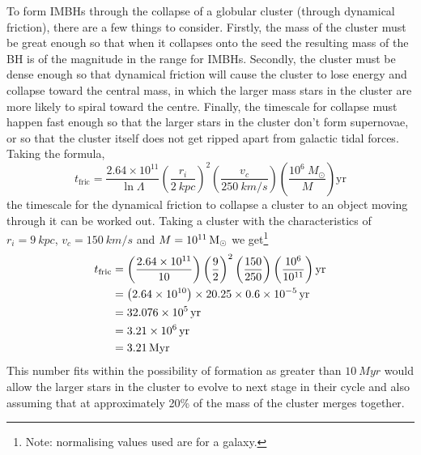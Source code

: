 \documentclass[a4paper]{article} %
\newcommand{\ms}[1]{\SI{#1}{M_{\odot}}}
\begin{document}
To form IMBHs through the collapse of a globular cluster (through dynamical friction), there are a few things to consider. Firstly, the mass of the cluster must be great enough so that when it collapses onto the seed the resulting mass of the BH is of the magnitude in the range for IMBHs. Secondly, the cluster must be dense enough so that dynamical friction will cause the cluster to lose energy and collapse toward the central mass, in which the larger mass stars in the cluster are more likely to spiral toward the centre. Finally, the timescale for collapse must happen fast enough so that the larger stars in the cluster don't form supernovae, or so that the cluster itself does not get ripped apart from galactic tidal forces.
Taking the formula,
\begin{equation}
t_{\text{fric}}=\frac{2.64\times 10^{11}}{\ln \Lambda}\left(\frac{r_i}{\SI{2}{kpc}}\right)^2\left(\frac{v_c}{\SI{250}{km/s}}\right)\left(\frac{10^6~M_{\odot}}{M}\right)\text{yr}
\end{equation}
the timescale for the dynamical friction to collapse a cluster to an object moving through it can be worked out. Taking a cluster with the characteristics of $r_i=\SI{9}{kpc}$, $v_c=\SI{150}{km/s}$ and $M=\ms{d11}$ we get\footnote{Note: normalising values used are for a galaxy.}
\begin{align}
t_{\text{fric}}&=\left(\frac{2.64\times 10^{11}}{10}\right)\left(\frac{9}{2}\right)^2\left(\frac{150}{250}\right)
\left(\frac{10^6}{10^{11}}\right)\text{yr}\\
&=\left(2.64\times 10^{10}\right)\times 20.25\times 0.6\times \SI{d-5}{yr}\\
&=\SI{32.076d5}{yr}\\
&=\SI{3.21d6}{yr}\\
&=\SI{3.21}{Myr}
\end{align}
This number fits within the possibility of formation as greater than $\SI{10}{Myr}$ would allow the larger stars in the cluster to evolve to next stage in their cycle and also assuming that at approximately 20\% of the mass of the cluster merges together.



\end{document}
